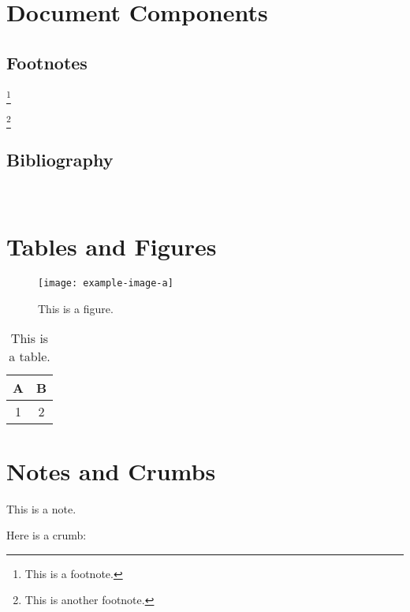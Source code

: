 \section{Document Components}

\subsection{Footnotes}

\lipsum[1]\footnote{This is a footnote.}

\lipsum[2]\footnote{This is another footnote.}

\subsection{Bibliography}

\lipsum[3]~\cite{SCSF00045714}

\section{Tables and Figures}

\begin{figure}[H]
    \centering
    \texttt{[image: example-image-a]}
    \caption{This is a figure.}
    \label{fig:example}
\end{figure}

\begin{table}[H]
    \centering
    \begin{tabular}{cc}
        \toprule
        \textbf{A} & \textbf{B} \\
        \midrule
        1          & 2          \\
        \bottomrule
    \end{tabular}
    \caption{This is a table.}
    \label{tab:example}
\end{table}

\section{Notes and Crumbs}

\begin{note}
    This is a note.
\end{note}

Here is a crumb:


\PrintBibliography
